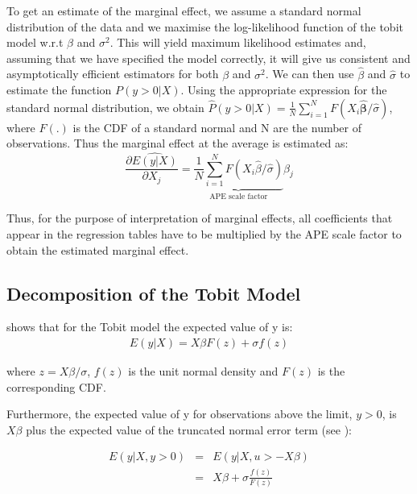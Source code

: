 \documentclass[preprint,12pt,authoryear]{elsarticle}
\begin{document}
	
	\noindent To get an estimate of the marginal effect, we assume a standard normal distribution of the data and we maximise the log-likelihood function of the tobit model w.r.t $\beta$ and $\sigma^2$. This will yield maximum likelihood estimates and, assuming that we have specified the model correctly, it will give us consistent and asymptotically efficient estimators for both $\beta$ and $\sigma^2$. We can then use $\hat{\beta}$ and $\hat{\sigma}$ to estimate the function $P(y>0|X)$. Using the appropriate expression for the standard normal distribution, we obtain $\hat{P}(y>0|X)=\frac{1}{N} \sum_{i=1}^N F(X_i \hat{\boldsymbol{\beta}}/ \hat{\sigma})$, where $F(.)$ is the CDF of a standard normal and N are the number of observations. Thus the marginal effect at the average is estimated as:
	\[
	\frac{\partial \widehat{E(y|X)}}{\partial X_j} = \underbrace{\frac{1}{N} \sum_{i=1}^N F(X_{i} \hat{\beta}/ \hat{\sigma})}_\text{APE scale factor} \hat \beta_j
	\]
	
	\noindent 
	Thus, for the purpose of interpretation of marginal effects, all coefficients that appear in the regression tables have to be multiplied by the APE scale factor to obtain the estimated marginal effect. 
	\vspace{3mm}
	
	\subsection{Decomposition of the Tobit Model}
	
	\noindent \cite{Tobin1958} shows that for the Tobit model the expected value of y is:
	\begin{eqnarray}
	E(y| X) = X \beta F(z) + \sigma f(z)
	\label{eqn:Ey}
	\end{eqnarray}
	
	
	where $z=X \beta/ \sigma$, $f(z)$ is the unit normal density and $F(z)$ is the corresponding CDF.
	
	\vspace{3mm}
	
	\noindent Furthermore, the expected value of y for observations above the limit, $y>0$, is $X \beta$ plus the expected value of the truncated normal error term (see \cite{Amemiya1973}):
	
	
	\begin{eqnarray}
	E(y|X, y>0)&=& E(y| X,u>-X \beta)\nonumber \\
	&=& X\beta + \sigma \frac{f(z)}{F(z)} \label{eqn:Ey*}
	\end{eqnarray}
	
\end{document}
